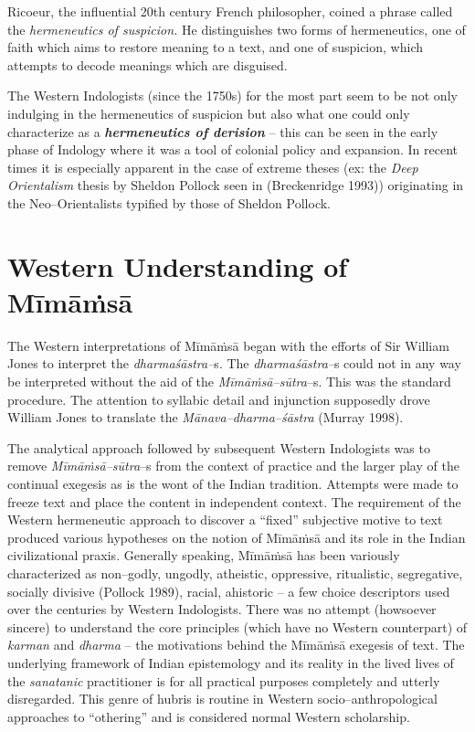 Ricoeur, the influential 20th century French philosopher, coined a phrase called the \textit{hermeneutics of suspicion.} He distinguishes two forms of hermeneutics, one of faith which aims to restore meaning to a text, and one of suspicion, which attempts to decode meanings which are disguised.

The Western Indologists (since the 1750s) for the most part seem to be not only indulging in the hermeneutics of suspicion but also what one could only characterize as a \textbf{\textit{hermeneutics of derision}} – this can be seen in the early phase of Indology where it was a tool of colonial policy and expansion. In recent times it is especially apparent in the case of extreme theses (ex: the \textit{Deep Orientalism} thesis by Sheldon Pollock seen in (Breckenridge 1993)) originating in the Neo–Orientalists typified by those of Sheldon Pollock.


\section*{Western Understanding of Mīmāṁsā}

The Western interpretations of Mīmāṁsā began with the efforts of Sir William Jones to interpret the \textit{dharmaśāstra–}s. The \textit{dharmaśāstra–}s could not in any way be interpreted without the aid of the \textit{Mīmāṁsā–sūtra}–s. This was the standard procedure. The attention to syllabic detail and injunction supposedly drove William Jones to translate the \textit{Mānava–dharma–śāstra} (Murray 1998).

The analytical approach followed by subsequent Western Indologists was to remove \textit{Mīmāṁsā–sūtra}–s from the context of practice and the larger play of the continual exegesis as is the wont of the Indian tradition. Attempts were made to freeze text and place the content in independent context. The requirement of the Western hermeneutic approach to discover a “fixed” subjective motive to text produced various hypotheses on the notion of Mīmāṁsā and its role in the Indian civilizational praxis. Generally speaking, Mīmāṁsā has been variously characterized as non–godly, ungodly, atheistic, oppressive, ritualistic, segregative, socially divisive (Pollock 1989), racial, ahistoric – a few choice descriptors used over the centuries by Western Indologists. There was no attempt (howsoever sincere) to understand the core principles (which have no Western counterpart) of \textit{karman} and \textit{dharma} – the motivations behind the Mīmāṁsā exegesis of text. The underlying framework of Indian epistemology and its reality in the lived lives of the \textit{sanatanic} practitioner is for all practical purposes completely and utterly disregarded. This genre of hubris is routine in Western socio–anthropological approaches to “othering” and is considered normal Western scholarship.

